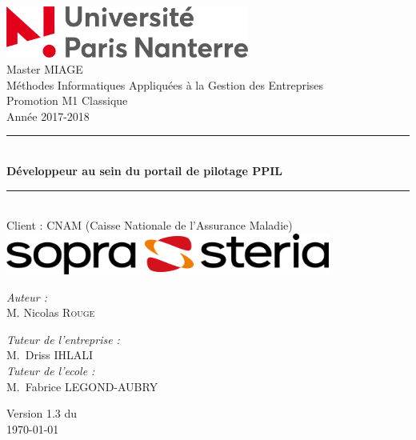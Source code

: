 \documentclass[a4paper,12pt]{book}
\theoremstyle{break}
\begin{document}

\begin{titlepage}
\begin{center}

\includegraphics[width=0.6\textwidth]{logo_parisNanterre.png}\\[1cm]
{\large Master MIAGE}\\[0.5cm]
{\large Méthodes Informatiques Appliquées à la Gestion des Entreprises}\\[0.5cm]
{\large Promotion M1 Classique}\\[0.5cm]
{\large Année 2017-2018}\\[0.5cm]

\rule{\linewidth}{0.5mm} \\[0.4cm]
{ \huge \bfseries  Développeur au sein du portail de pilotage PPIL\\[0.4cm] }
\rule{\linewidth}{0.5mm} \\[1.5cm]
{\large Client : CNAM (Caisse Nationale de l'Assurance Maladie)}\\[0.5cm]
\includegraphics[width=0.8\textwidth]{logo-soprasteria-2.png}\\[1cm]
\noindent
\begin{minipage}{0.4\textwidth}
  \begin{flushleft} \large
    \emph{Auteur :}\\
    M. Nicolas \textsc{Rouge}\\
  \end{flushleft}
\end{minipage}%
\begin{minipage}{0.6\textwidth}
  \begin{flushright} \large
    \emph{Tuteur de l'entreprise :} \\
    M.~Driss \textsc{IHLALI}\\
    \emph{Tuteur de l'ecole :} \\
    M.~Fabrice \textsc{LEGOND-AUBRY}
  \end{flushright}
\end{minipage}

\vfill

{\large Version 1.3 du\\ \today}

\end{center}
\end{titlepage}
\end{document}
